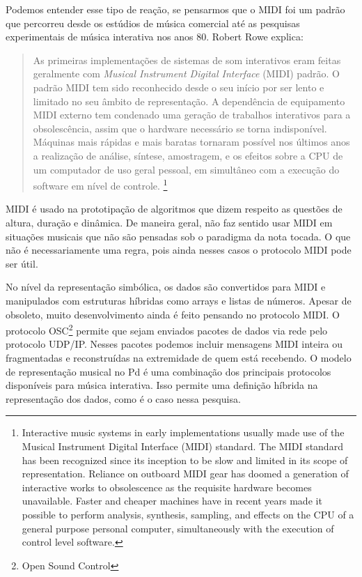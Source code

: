 \documentclass[draft]{ppgmus}
\begin{document}
Podemos entender esse tipo de reação, se pensarmos que o MIDI foi um padrão
que percorreu desde os estúdios de música comercial até as pesquisas experimentais
de música interativa nos anos 80. Robert Rowe explica:

\begin{quote}
As primeiras implementações de sistemas de som interativos eram feitas geralmente com \textit{Musical
Instrument Digital Interface} (MIDI) padrão. O padrão MIDI tem sido reconhecido desde o seu início
por ser lento e limitado no seu âmbito de representação. A dependência de equipamento MIDI externo tem
condenado uma geração de trabalhos interativos para a obsolescência, assim que o hardware necessário se torna indisponível.
Máquinas mais rápidas e mais baratas tornaram possível nos últimos anos a realização de análise, síntese, amostragem, 
e os efeitos sobre a CPU de um computador de uso geral pessoal, em simultâneo com a
execução do software em nível de controle. \cite{rowe05}
\footnote{
 Interactive music systems in early implementations usually made use of the Musical
Instrument Digital Interface (MIDI) standard. The MIDI standard has been recognized since its inception
to be slow and limited in its scope of representation. Reliance on outboard MIDI gear has
doomed a generation of interactive works to obsolescence as the requisite hardware becomes unavailable.
Faster and cheaper machines have in recent years made it possible to perform analysis, synthesis,
sampling, and effects on the CPU of a general purpose personal computer, simultaneously with the
execution of control level software.}
\end{quote}


MIDI é usado na prototipação de algoritmos que dizem respeito as questões de 
altura, duração e dinâmica. De maneira geral, não faz sentido usar MIDI em situações 
musicais que não são pensadas sob o paradigma da nota tocada. O que não é
necessariamente uma regra, pois ainda nesses casos o protocolo MIDI pode ser
útil.

No nível da representação simbólica, os dados são convertidos para MIDI e manipulados
com estruturas híbridas como arrays e listas de números. Apesar de obsoleto, muito desenvolvimento
ainda é feito pensando no protocolo MIDI. O protocolo OSC\footnote{Open Sound Control} permite que
sejam enviados pacotes de dados via rede pelo protocolo UDP/IP. Nesses pacotes podemos incluir
mensagens MIDI inteira ou fragmentadas e reconstruídas na extremidade de quem está recebendo.
O modelo de representação musical no Pd é uma combinação dos principais protocolos disponíveis para
música interativa. Isso permite uma definição híbrida na representação dos dados, como é o caso
nessa pesquisa.
\end{document}
